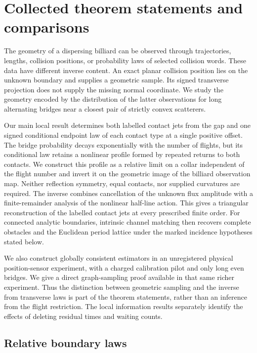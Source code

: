 \section{Collected theorem statements and comparisons}
\label{sec:v27-introduction}
\label{sec:v26-introduction}
\label{sec:v25-introduction}

The geometry of a dispersing billiard can be observed through trajectories,
lengths, collision positions, or probability laws of selected collision
words.  These data have different inverse content.  An exact planar
collision position lies on the unknown boundary and supplies a geometric
sample.  Its signed transverse projection does not supply the missing
normal coordinate.  We study the geometry encoded by the distribution of
the latter observations for long alternating bridges near a closest pair
of strictly convex scatterers.

Our main local result determines both labelled contact jets from the gap
and one signed conditional endpoint law of each contact type at a single
positive offset.  The bridge probability decays exponentially with the
number of flights, but its conditional law retains a nonlinear profile
formed by repeated returns to both contacts.  We construct this profile
as a relative limit on a collar independent of the flight number and
invert it on the geometric image of the billiard observation map.
Neither reflection symmetry, equal contacts, nor supplied curvatures are
required.  The inverse combines cancellation of the unknown flux
amplitude with a finite-remainder analysis of the nonlinear half-line
action.  This gives a triangular reconstruction of the labelled contact
jets at every prescribed finite order.  For connected analytic boundaries,
intrinsic channel matching then recovers complete obstacles and the
Euclidean period lattice under the marked incidence hypotheses stated
below.

We also construct globally consistent estimators in an unregistered
physical position-sensor experiment, with a charged calibration pilot and
only long even bridges.  We give a direct graph-sampling proof available
in that same richer experiment.  Thus the distinction between geometric
sampling and the inverse from transverse laws is part of the theorem
statements, rather than an inference from the flight restriction.  The
local information results separately identify the effects of deleting
residual times and waiting counts.

\subsection{Relative boundary laws}

